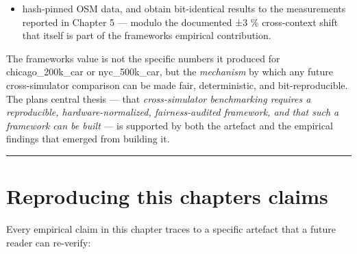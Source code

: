 \begin{itemize}
\tightlist
\item
  hash-pinned OSM data, and obtain bit-identical results to the
  measurements reported in Chapter 5 --- modulo the documented ±3 \%
  cross-context shift that itself is part of the
  framework\textquotesingle s empirical contribution.
\end{itemize}

The framework\textquotesingle s value is not the specific numbers it
produced for chicago\_200k\_car or nyc\_500k\_car, but the
\emph{mechanism} by which any future cross-simulator comparison can be
made fair, deterministic, and bit-reproducible. The
plan\textquotesingle s central thesis --- that \emph{cross-simulator
benchmarking requires a reproducible, hardware-normalized,
fairness-audited framework, and that such a framework can be built} ---
is supported by both the artefact and the empirical findings that
emerged from building it.

\begin{center}\rule{0.5\linewidth}{0.5pt}\end{center}

\section{Reproducing this chapter\textquotesingle s
claims}\label{67-reproducing-this-chapters-claims}

Every empirical claim in this chapter traces to a specific artefact that
a future reader can re-verify:

